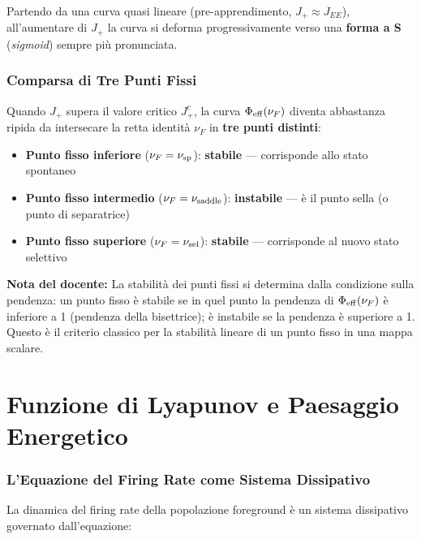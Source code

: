 Partendo da una curva quasi lineare (pre-apprendimento, $J_+ \approx J_{EE}$), all'aumentare di $J_+$ la curva si deforma progressivamente verso una \textbf{forma a S} (\textit{sigmoid}) sempre più pronunciata.

\subsubsection{Comparsa di Tre Punti Fissi}

Quando $J_+$ supera il valore critico $J_+^c$, la curva $\Phi_{\rm eff}(\nu_F)$ diventa abbastanza ripida da intersecare la retta identità $\nu_F$ in \textbf{tre punti distinti}:

\begin{itemize}
    \item \textbf{Punto fisso inferiore} ($\nu_F = \nu_{\rm sp}$): \textbf{stabile} — corrisponde allo stato spontaneo
    \item \textbf{Punto fisso intermedio} ($\nu_F = \nu_{\rm saddle}$): \textbf{instabile} — è il punto sella (o punto di separatrice)
    \item \textbf{Punto fisso superiore} ($\nu_F = \nu_{\rm sel}$): \textbf{stabile} — corrisponde al nuovo stato selettivo
\end{itemize}

\begin{tcolorbox}[colback=gray!5, colframe=gray!40, arc=2mm, boxrule=0.5pt]
\textbf{Nota del docente:} La stabilità dei punti fissi si determina dalla condizione sulla pendenza: un punto fisso è stabile se in quel punto la pendenza di $\Phi_{\rm eff}(\nu_F)$ è inferiore a 1 (pendenza della bisettrice); è instabile se la pendenza è superiore a 1. Questo è il criterio classico per la stabilità lineare di un punto fisso in una mappa scalare.
\end{tcolorbox}


\section{Funzione di Lyapunov e Paesaggio Energetico}

\subsubsection{L'Equazione del Firing Rate come Sistema Dissipativo}

La dinamica del firing rate della popolazione foreground è un sistema dissipativo governato dall'equazione:

